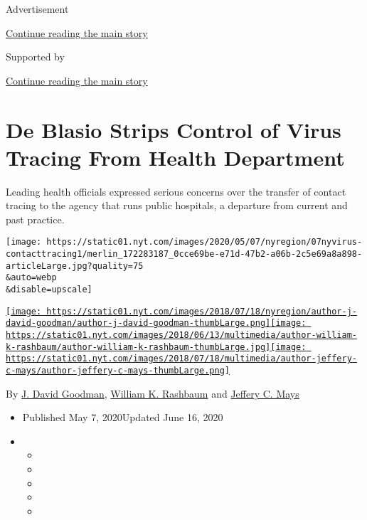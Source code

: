Advertisement

\protect\hyperlink{after-top}{Continue reading the main story}

Supported by

\protect\hyperlink{after-sponsor}{Continue reading the main story}

\hypertarget{de-blasio-strips-control-of-virus-tracing-from-health-department}{%
\section{De Blasio Strips Control of Virus Tracing From Health
Department}\label{de-blasio-strips-control-of-virus-tracing-from-health-department}}

Leading health officials expressed serious concerns over the transfer of
contact tracing to the agency that runs public hospitals, a departure
from current and past practice.

\texttt{[image: https://static01.nyt.com/images/2020/05/07/nyregion/07nyvirus-contacttracing1/merlin\_172283187\_0cce69be-e71d-47b2-a06b-2c5e69a8a898-articleLarge.jpg?quality=75\\\&auto=webp\\\&disable=upscale]}

\href{https://www.nytimes.com/by/j-david-goodman}{\texttt{[image: https://static01.nyt.com/images/2018/07/18/nyregion/author-j-david-goodman/author-j-david-goodman-thumbLarge.png]}}\href{https://www.nytimes.com/by/william-k-rashbaum}{\texttt{[image: https://static01.nyt.com/images/2018/06/13/multimedia/author-william-k-rashbaum/author-william-k-rashbaum-thumbLarge.jpg]}}\href{https://www.nytimes.com/by/jeffery-c-mays}{\texttt{[image: https://static01.nyt.com/images/2018/07/18/multimedia/author-jeffery-c-mays/author-jeffery-c-mays-thumbLarge.png]}}

By \href{https://www.nytimes.com/by/j-david-goodman}{J. David Goodman},
\href{https://www.nytimes.com/by/william-k-rashbaum}{William K.
Rashbaum} and \href{https://www.nytimes.com/by/jeffery-c-mays}{Jeffery
C. Mays}

\begin{itemize}
\item
  Published May 7, 2020Updated June 16, 2020
\item
  \begin{itemize}
  \item
  \item
  \item
  \item
  \item
  \end{itemize}
\end{itemize}

